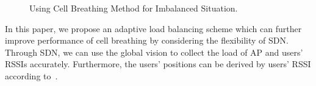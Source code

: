 \begin{figure}
	\centering
		
		
	\caption{Using Cell Breathing Method for Imbalanced Situation.}
	\label{fig:cell-breathing}
\end{figure}

In this paper, we propose an adaptive load balancing scheme which can further improve performance of
cell breathing by considering the flexibility of SDN.
Through SDN, we can use the global vision to collect the load of AP and users' RSSIs accurately. 
Furthermore, the users' positions can be derived by users' RSSI according to~\cite{zaruba2007indoor}. 

